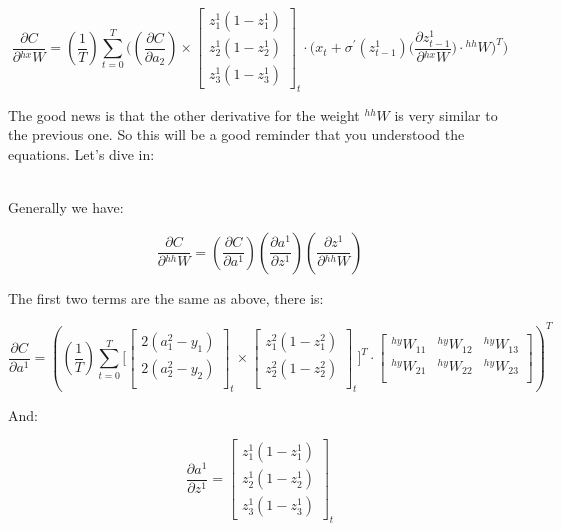 \documentclass[12pt]{article}
\begin{document}
    
\[
\dfrac{\partial C}{\partial {}^{hx}W}
=
(\dfrac{1}{T}) \sum_{t=0}^{T} 
\Bigg(
\left( \dfrac{\partial C}{\partial a_{2}}\right)
\times 
\begin{bmatrix}
z_{1}^{1}(1 - z_{1}^{1})\\
z_{2}^{1}(1 - z_{2}^{1})\\
z_{3}^{1}(1 - z_{3}^{1})
\end{bmatrix}_{t}
\cdot
\Big (
x_{t} + \sigma^{'}(z^{1}_{t-1}) \Big (\dfrac{\partial z^{1}_{t-1}}{\partial {}^{hx}W} \Big )\cdot {}^{hh}W
\Big )^{T}
\Bigg)
\]

The good news is that the other derivative for the weight ${}^{hh}W$ is very similar to the previous one. So this will be a good reminder that you understood the equations. Let's dive in:

\mbox{} \\

Generally we have:

\begin{equation}
    \dfrac{\partial C}{\partial {}^{hh}W} = \left( \dfrac{\partial C}{\partial a^{1}}\right) \left( \dfrac{\partial a^{1}}{\partial z^{1}}\right) \left(\dfrac{\partial z^{1}}{\partial {}^{hh}W} \right)
    \label{whh}
\end{equation}

The first two terms are the same as above, there is: 


\[
\dfrac{\partial C}{\partial a^{1}}
=
\left(
(\dfrac{1}{T}) \sum_{t=0}^{T} 
\Bigg[
\begin{bmatrix}
2(a_{1}^{2} - y_{1})\\
2(a_{2}^{2} - y_{2})\\
\end{bmatrix}_{t}
\times
\begin{bmatrix}
z_{1}^{2}(1 - z_{1}^{2})\\
z_{2}^{2}(1 - z_{2}^{2})\\
\end{bmatrix}_{t}
\Bigg]^{T}
\cdot
\begin{bmatrix}
{}^{hy}W_{11} & {}^{hy}W_{12} & {}^{hy}W_{13} \\
{}^{hy}W_{21} & {}^{hy}W_{22} & {}^{hy}W_{23} \\ 
\end{bmatrix}
\right)^{T}
\]

And:

\[
\dfrac{\partial a^{1}}{\partial z^{1}}
=
\begin{bmatrix}
z_{1}^{1}(1 - z_{1}^{1})\\
z_{2}^{1}(1 - z_{2}^{1})\\
z_{3}^{1}(1 - z_{3}^{1})
\end{bmatrix}_{t}
\]
\end{document}

